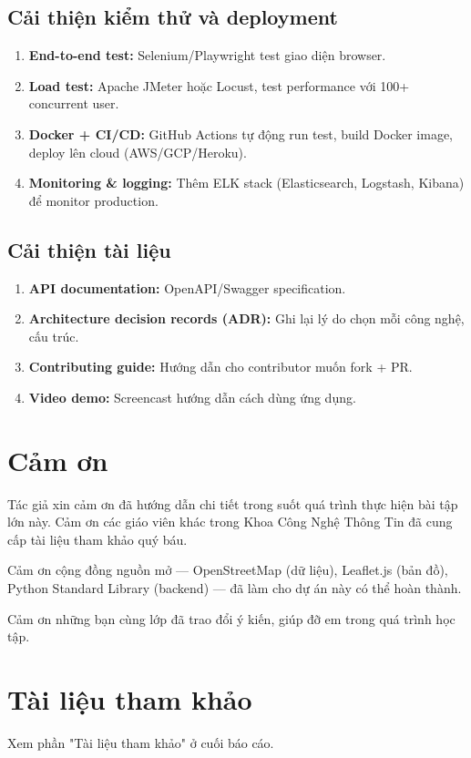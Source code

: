 \subsection{Cải thiện kiểm thử và deployment}

\begin{enumerate}
  \item \textbf{End-to-end test:} Selenium/Playwright test giao diện browser.

  \item \textbf{Load test:} Apache JMeter hoặc Locust, test performance với 100+ concurrent user.

  \item \textbf{Docker + CI/CD:} GitHub Actions tự động run test, build Docker image, deploy lên cloud (AWS/GCP/Heroku).

  \item \textbf{Monitoring \& logging:} Thêm ELK stack (Elasticsearch, Logstash, Kibana) để monitor production.
\end{enumerate}

\subsection{Cải thiện tài liệu}

\begin{enumerate}
  \item \textbf{API documentation:} OpenAPI/Swagger specification.

  \item \textbf{Architecture decision records (ADR):} Ghi lại lý do chọn mỗi công nghệ, cấu trúc.

  \item \textbf{Contributing guide:} Hướng dẫn cho contributor muốn fork + PR.

  \item \textbf{Video demo:} Screencast hướng dẫn cách dùng ứng dụng.
\end{enumerate}

\section{Cảm ơn}

Tác giả xin cảm ơn \gvname{} đã hướng dẫn chi tiết trong suốt quá trình thực hiện bài tập lớn này. Cảm ơn các giáo viên khác trong Khoa Công Nghệ Thông Tin đã cung cấp tài liệu tham khảo quý báu.

Cảm ơn cộng đồng nguồn mở --- OpenStreetMap (dữ liệu), Leaflet.js (bản đồ), Python Standard Library (backend) --- đã làm cho dự án này có thể hoàn thành.

Cảm ơn những bạn cùng lớp đã trao đổi ý kiến, giúp đỡ em trong quá trình học tập.

\section{Tài liệu tham khảo}

Xem phần "Tài liệu tham khảo" ở cuối báo cáo.
